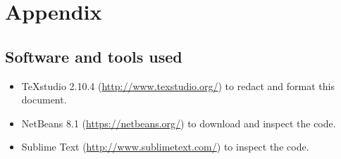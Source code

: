 \documentclass[a4paper,11pt]{report} %
\begin{document}
%		
%		
%		
%	
	

	\section{Appendix}
	
	\subsection{Software and tools used}
		\begin{itemize}
			\item TeXstudio 2.10.4 (\href{http://www.texstudio.org/}{http://www.texstudio.org/}) to redact and format this document.
			\item NetBeans 8.1 (\href{https://netbeans.org/}{https://netbeans.org/}) to download and inspect the code.
			\item Sublime Text (\href{http://www.sublimetext.com/}{http://www.sublimetext.com/}) to inspect the code.
		\end{itemize}
		
\end{document}
